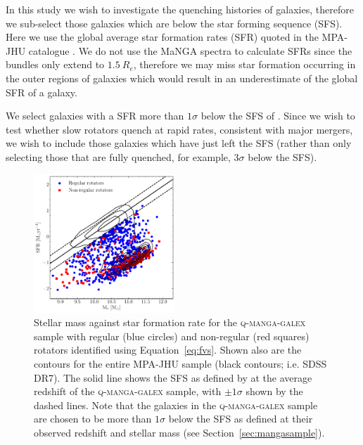 \documentclass[useAMS,usenatbib]{mn2e}
\begin{document}
In this study we wish to investigate the quenching histories of galaxies, therefore we sub-select those galaxies which are below the star forming sequence (SFS). Here we use the global average star formation rates (SFR) quoted in the MPA-JHU catalogue \citep[][which are corrected for aperture bias]{kauffmann03, brinchmann04}. We do not use the MaNGA spectra to calculate SFRs since the bundles only extend to $1.5~R_e$, therefore we may miss star formation occurring in the outer regions of galaxies which would result in an underestimate of the global SFR of a galaxy. 

We select galaxies with a SFR more than $1\sigma$ below the SFS of \cite{peng10}. Since we wish to test whether slow rotators quench at rapid rates, consistent with major mergers, we wish to include those galaxies which have just left the SFS (rather than only selecting those that are fully quenched, for example, $3\sigma$ below the SFS).

\begin{figure}
\centering
\includegraphics[width=0.475\textwidth]{../figures/nonSF_FR_SR_SFS_scatter.pdf}
\caption{Stellar mass against star formation rate for the \textsc{q-manga-galex} sample with regular (blue circles) and non-regular (red squares) rotators identified using Equation~\ref{eq:fvs}. Shown also are the contours for the entire MPA-JHU sample (black contours; i.e. SDSS DR7). The solid line shows the SFS as defined by \protect\cite{peng10} at the average redshift of the \textsc{q-manga-galex} sample, with $\pm 1 \sigma$ shown by the dashed lines. Note that the galaxies in the \textsc{q-manga-galex} sample are chosen to be more than $1\sigma$ below the SFS as defined at their observed redshift and stellar mass (see Section~\protect\ref{sec:mangasample}).}
\label{fig:masvsfr}
\end{figure}
\end{document}
